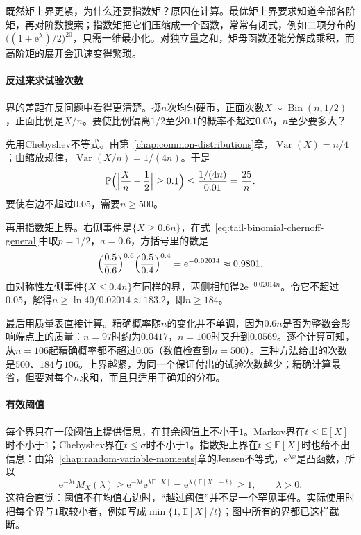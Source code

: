 既然矩上界更紧，为什么还要指数矩？原因在计算。最优矩上界要求知道全部各阶矩，再对阶数搜索；指数矩把它们压缩成一个函数，常常有闭式，例如二项分布的$\bigl((1+\mathrm{e}^{\lambda})/2\bigr)^{20}$，只需一维最小化。对独立量之和，矩母函数还能分解成乘积，而高阶矩的展开会迅速变得繁琐。

\paragraph{反过来求试验次数}
界的差距在反问题中看得更清楚。掷$n$次均匀硬币，正面次数$X\sim\operatorname{Bin}(n,1/2)$，正面比例是$X/n$。要使比例偏离$1/2$至少$0.1$的概率不超过$0.05$，$n$至少要多大？

先用Chebyshev不等式。由第~\ref{chap:common-distributions}章，$\operatorname{Var}(X)=n/4$；由缩放规律，$\operatorname{Var}(X/n)=1/(4n)$。于是
\[
 \mathbb{P}\Bigl(\Bigl\lvert\frac{X}{n}-\frac12\Bigr\rvert\geq0.1\Bigr)\leq\frac{1/(4n)}{0.01}=\frac{25}{n} .
\]
要使右边不超过$0.05$，需要$n\geq500$。

再用指数矩上界。右侧事件是$\{X\geq0.6n\}$，在式~\eqref{eq:tail-binomial-chernoff-general}中取$p=1/2$，$a=0.6$，方括号里的数是
\[
 \Bigl(\frac{0.5}{0.6}\Bigr)^{0.6}\Bigl(\frac{0.5}{0.4}\Bigr)^{0.4}=\mathrm{e}^{-0.02014}\approx0.9801 .
\]
由对称性左侧事件$\{X\leq0.4n\}$有同样的界，两侧相加得$2\mathrm{e}^{-0.02014n}$。令它不超过$0.05$，解得$n\geq\ln40/0.02014\approx183.2$，即$n\geq184$。

最后用质量表直接计算。精确概率随$n$的变化并不单调，因为$0.6n$是否为整数会影响端点上的质量：$n=97$时约为$0.0417$，$n=100$时又升到$0.0569$。逐个计算可知，从$n=106$起精确概率都不超过$0.05$（数值检查到$n=500$）。三种方法给出的次数是$500$、$184$与$106$。上界越紧，为同一个保证付出的试验次数越少；精确计算最省，但要对每个$n$求和，而且只适用于确知的分布。

\paragraph{有效阈值}
每个界只在一段阈值上提供信息，在其余阈值上不小于$1$。Markov界在$t\leq\mathbb{E}[X]$时不小于$1$；Chebyshev界在$t\leq\sigma$时不小于$1$。指数矩上界在$t\leq\mathbb{E}[X]$时也给不出信息：由第~\ref{chap:random-variable-moments}章的Jensen不等式，$\mathrm{e}^{\lambda x}$是凸函数，所以
\[
 \mathrm{e}^{-\lambda t}M_X(\lambda)\geq\mathrm{e}^{-\lambda t}\mathrm{e}^{\lambda\mathbb{E}[X]}=\mathrm{e}^{\lambda(\mathbb{E}[X]-t)}\geq1,\qquad \lambda>0 .
\]
这符合直觉：阈值不在均值右边时，“越过阈值”并不是一个罕见事件。实际使用时把每个界与$1$取较小者，例如写成$\min\{1,\mathbb{E}[X]/t\}$；图中所有的界都已这样截断。

